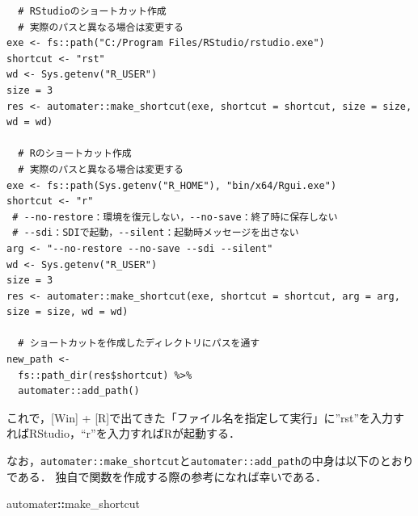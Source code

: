 \documentclass[
]{article}
\newenvironment{Shaded}{\begin{snugshade}}{\end{snugshade}}
\newcommand{\NormalTok}[1]{#1}
\newcommand{\SpecialCharTok}[1]{\textcolor[rgb]{0.81,0.36,0.00}{\textbf{#1}}}
\begin{document}
\begin{verbatim}
  # RStudioのショートカット作成
  # 実際のパスと異なる場合は変更する
exe <- fs::path("C:/Program Files/RStudio/rstudio.exe")
shortcut <- "rst"
wd <- Sys.getenv("R_USER")
size = 3
res <- automater::make_shortcut(exe, shortcut = shortcut, size = size, wd = wd)

  # Rのショートカット作成
  # 実際のパスと異なる場合は変更する
exe <- fs::path(Sys.getenv("R_HOME"), "bin/x64/Rgui.exe")
shortcut <- "r"
 # --no-restore：環境を復元しない，--no-save：終了時に保存しない
 # --sdi：SDIで起動，--silent：起動時メッセージを出さない
arg <- "--no-restore --no-save --sdi --silent"
wd <- Sys.getenv("R_USER")
size = 3
res <- automater::make_shortcut(exe, shortcut = shortcut, arg = arg, size = size, wd = wd)

  # ショートカットを作成したディレクトリにパスを通す
new_path <- 
  fs::path_dir(res$shortcut) %>%
  automater::add_path()
\end{verbatim}

これで，{[}Win{]} + {[}R{]}で出てきた「ファイル名を指定して実行」に''rst''を入力すればRStudio，``r''を入力すればRが起動する．

なお，\texttt{automater::make\_shortcut}と\texttt{automater::add\_path}の中身は以下のとおりである．
独自で関数を作成する際の参考になれば幸いである．

\begin{Shaded}
\begin{Highlighting}[]
\NormalTok{automater}\SpecialCharTok{::}\NormalTok{make\_shortcut}
\end{Highlighting}
\end{Shaded}
\end{document}
